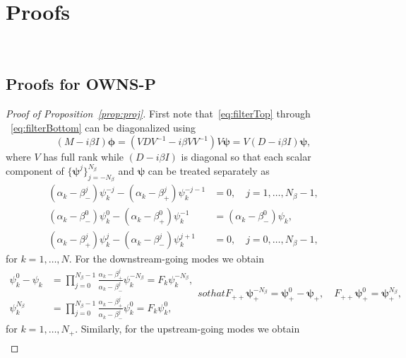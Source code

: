 \section{Proofs}~\label{app:Proofs}


\subsection{Proofs for OWNS-P}\label{app:Proofs-P}

\begin{proof}[Proof of Proposition~\ref{prop:proj}]
    First note that~\eqref{eq:filterTop} through ~\eqref{eq:filterBottom} can be diagonalized using
    \[
    (M-i\beta I)\hat{\bm{\phi}}
    =(VDV^{-1}-i\beta VV^{-1})V\bm{\psi}
    =V(D-i\beta I)\bm{\psi},
    \]
    where $V$ has full rank while $(D-i\beta I)$ is diagonal so that each scalar component of $\{\bm{\psi}^{j}\}_{j=-N_\beta}^{N_\beta}$ and $\bm{\psi}$ can be treated separately as
    \begin{align*}
        (\alpha_k-\beta_-^j)\psi_{k}^{-j}-(\alpha_k-\beta_+^j)\psi_{k}^{-j-1}&=0,\quad j=1,\dots,N_\beta-1,\\
        (\alpha_k-\beta_-^0)\psi_{k}^{0}-(\alpha_k-\beta_+^0)\psi_{k}^{-1}&=(\alpha_k-\beta_-^0)\psi_k,\\
        (\alpha_k-\beta_+^j)\psi_{k}^{j}-(\alpha_k-\beta_-^j)\psi_{k}^{j+1}&=0,\quad j=0,\dots,N_\beta-1,
    \end{align*}
    for $k=1,\dots,N$. For the downstream-going modes we obtain
    \begin{subequations}
    \begin{align}
        \psi_k^{0}-\psi_k&=\prod_{j=0}^{N_\beta-1}\frac{\alpha_k - \beta_+^j}{\alpha_k- \beta_-^{j}}\psi_k^{-N_\beta} = F_k\psi_k^{-N_\beta},\label{eq:owns-p-filter-downstream}\\
        \psi_k^{ N_\beta}&=\prod_{j=0}^{N_\beta-1}\frac{\alpha_k - \beta_+^j}{\alpha_k- \beta_-^{j}}\psi_k^0          = F_k\psi_k^{0}       ,
    \end{align}
    so that
    \begin{equation}
    F_{++}\bm{\psi}_+^{-N_\beta} = \bm{\psi}_+^{0}-\bm{\psi}_+,\quad
    F_{++}\bm{\psi}_+^{0}        = \bm{\psi}_+^{N_\beta},
    \end{equation}
    \end{subequations}
    for $k=1,\dots,N_+$. Similarly, for the upstream-going modes we obtain
    \begin{subequations}
    \begin{align}

\end{align}
\end{subequations}
\end{proof}
